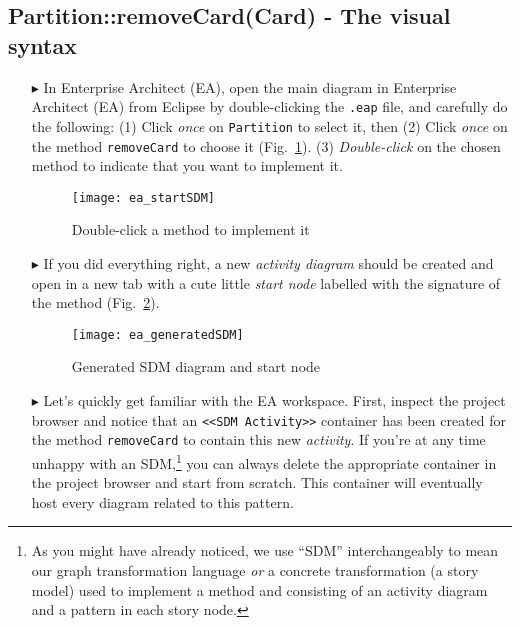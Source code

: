 \newpage
\hypertarget{remCard vis}{}
\subsection{Partition::removeCard(Card) - The visual syntax}
\visHeader

\begin{itemize}

\item[$\blacktriangleright$] In Enterprise Architect (EA), open the main diagram in Enterprise Architect (EA) from Eclipse by double-clicking the \texttt{.eap}
file, and carefully do the following: (1) Click \emph{once} on \texttt{Partition} to select it, then (2) Click \emph{once} on the method
\texttt{removeCard} to choose it (Fig.~\ref{fig:sdm_start}). (3) \emph{Double-click} on the chosen method to indicate that you want to implement it.

\begin{figure}[htp]
\begin{center}
  \texttt{[image: ea\_startSDM]}
  \caption{Double-click a method to implement it}  
  \label{fig:sdm_start}
\end{center}
\end{figure}
 
\item[$\blacktriangleright$] If you did everything right, a new \emph{activity diagram} should be created and open in a new tab with a cute little \emph{start node} 
labelled with the signature of the method (Fig.~\ref{fig:sdm_skeleton}).  

\begin{figure}[htp]
\begin{center}
  \texttt{[image: ea\_generatedSDM]}
  \caption{Generated SDM diagram and start node}  
  \label{fig:sdm_skeleton}
\end{center}
\end{figure}

\vspace{0.5cm}

\item[$\blacktriangleright$] Let's quickly get familiar with the EA workspace. First, inspect the project browser and notice that an \texttt{<<SDM Activity>>}
container has been created for the method \texttt{removeCard} to contain this new \emph{activity}. If you're at any time unhappy with an SDM,\footnote{As you
might have already noticed, we use ``SDM'' interchangeably to mean our graph transformation language \emph{or} a concrete transformation (a story model) used
to implement a method and consisting of an activity diagram and a pattern in each story node.} you can always delete the appropriate container in the project
browser and start from scratch. This container will eventually host every diagram related to this pattern.


\end{itemize}
